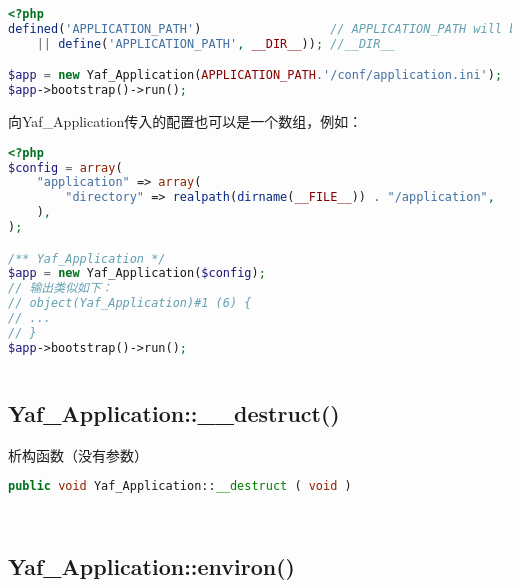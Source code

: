 \begin{lstlisting}[language=PHP]
<?php
defined('APPLICATION_PATH')                  // APPLICATION_PATH will be used in the ini config file
    || define('APPLICATION_PATH', __DIR__)); //__DIR__ 

$app = new Yaf_Application(APPLICATION_PATH.'/conf/application.ini');
$app->bootstrap()->run();
\end{lstlisting}

向Yaf\_Application传入的配置也可以是一个数组，例如：

\begin{lstlisting}[language=PHP]
<?php
$config = array(
    "application" => array(
        "directory" => realpath(dirname(__FILE__)) . "/application",
    ),
);

/** Yaf_Application */
$app = new Yaf_Application($config);
// 输出类似如下：
// object(Yaf_Application)#1 (6) {
// ...
// }
$app->bootstrap()->run();
\end{lstlisting}



\begin{lstlisting}[language=PHP]

\end{lstlisting}


\subsection{Yaf\_Application::\_\_destruct()}

析构函数（没有参数）






\begin{lstlisting}[language=PHP]
public void Yaf_Application::__destruct ( void )
\end{lstlisting}



\begin{lstlisting}[language=PHP]

\end{lstlisting}



\begin{lstlisting}[language=PHP]

\end{lstlisting}


\subsection{Yaf\_Application::environ()}


